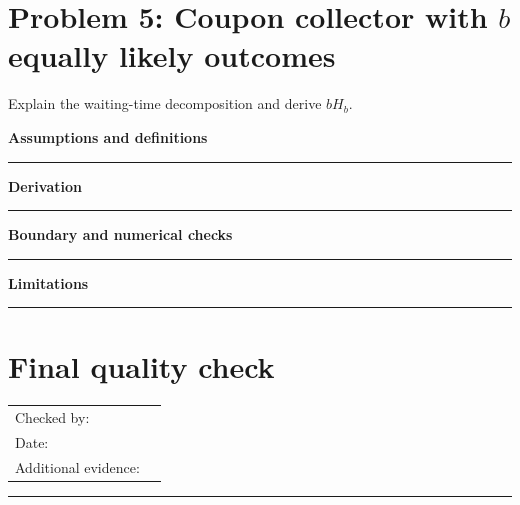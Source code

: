 \documentclass[11pt]{article}
\begin{document}
\section{\texorpdfstring{Problem 5: Coupon collector with $b$ equally likely outcomes}{Problem 5: Coupon collector with b equally likely outcomes}}
Explain the waiting-time decomposition and derive $bH_b$.\par\medskip
\textbf{Assumptions and definitions}\par\vspace{0.7cm}\hrule\vspace{0.35cm}
\textbf{Derivation}\par\vspace{2.1cm}\hrule\vspace{0.3cm}
\textbf{Boundary and numerical checks}\par\vspace{1.1cm}\hrule\vspace{0.35cm}
\textbf{Limitations}\par\vspace{0.9cm}\hrule\vspace{0.35cm}
\clearpage
\section{Final quality check}
\begin{tabularx}{\linewidth}{@{}lX@{}}Checked by: & \hrulefill\\ Date: & \hrulefill\\ Additional evidence: & \hrulefill\\\end{tabularx}
\vspace{3cm}\hrule
\end{document}
